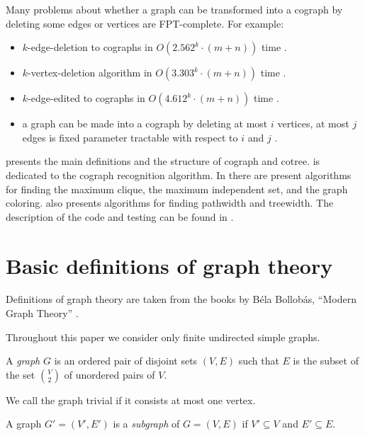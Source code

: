 Many problems about whether a graph can be transformed into a cograph by deleting some edges or vertices are FPT-complete. 
For example:
\begin{itemize}
    \item $k$-edge-deletion to cographs in $O(2.562^k \cdot (m + n))$ time \cite{nastos_gao_10}.
    \item $k$-vertex-deletion algorithm in $O(3.303^k \cdot (m +n))$ time \cite{nastos_gao_10}.
    \item $k$-edge-edited to cographs in $O(4.612^k \cdot (m+n))$ time \cite{Liu2012ComplexityAP}.
    \item a graph can be made into a cograph by deleting at most $i$ vertices, at most $j$ edges is fixed parameter tractable with respect to $i$ and $j$ \cite{Cai1996FixedParameterTO}.
\end{itemize}


 presents the main definitions and the structure of cograph and cotree.  is dedicated to the cograph recognition algorithm. 
In  there are present algorithms for finding the maximum clique, the maximum independent set, and the graph coloring.  also presents algorithms for finding pathwidth and treewidth. The description of the code and testing can be found in .

\section{Basic definitions of graph theory}


Definitions of graph theory are taken from the books by Béla Bollobás, “Modern Graph Theory” \cite{Bollobs2002ModernGT}. 


Throughout this paper we consider only finite undirected simple graphs.

\begin{definition}[Graph]
  A \emph{graph} $G$ is an ordered pair of disjoint sets $(V, E)$ such that $E$ is the subset of the set $V \choose 2$ of unordered pairs of $V$.
\end{definition}

We call the graph trivial if it consists at most one vertex.

\begin{definition}[Subgraph]
  A graph $G' = (V', E')$ is a \emph{subgraph} of $G = (V, E)$ if $V' \subseteq V$ and $E' \subseteq E$.
\end{definition}

